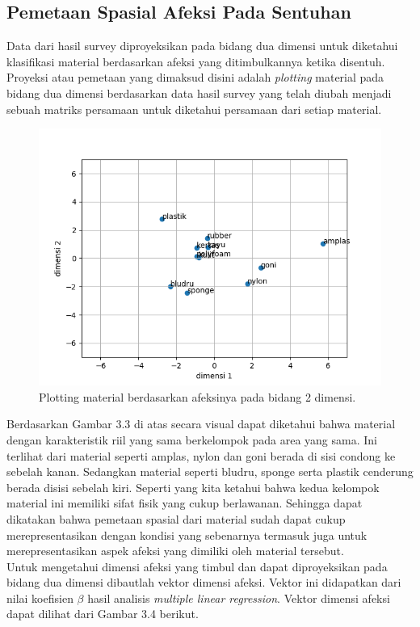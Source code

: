 \documentclass{Jurnal_kolo}
\begin{document}
\begin{multicols}{2}
	\subsection{Pemetaan Spasial Afeksi Pada Sentuhan}
	\indent Data dari hasil survey diproyeksikan pada bidang dua dimensi untuk diketahui klasifikasi material berdasarkan afeksi yang ditimbulkannya ketika disentuh. Proyeksi atau pemetaan yang dimaksud disini adalah \emph{plotting} material pada bidang dua dimensi berdasarkan data hasil survey yang telah diubah menjadi sebuah matriks persamaan untuk diketahui persamaan dari setiap material. 
	
		\begin{figure}[H]
		\centering
		\includegraphics[scale=0.5]{gambar/plotmaterial.png}
		\caption{Plotting material berdasarkan afeksinya pada bidang 2 dimensi.}
		\label{plot_1}
	\end{figure}   
	\indent Berdasarkan Gambar 3.3 di atas secara visual dapat diketahui bahwa material dengan karakteristik riil yang sama berkelompok pada area yang sama. Ini terlihat dari material seperti amplas, nylon dan goni berada di sisi condong ke sebelah kanan. Sedangkan material seperti bludru, sponge serta plastik cenderung berada disisi sebelah kiri. Seperti yang kita ketahui bahwa kedua kelompok material ini memiliki sifat fisik yang cukup berlawanan. Sehingga dapat dikatakan bahwa pemetaan spasial dari material sudah dapat cukup merepresentasikan dengan kondisi yang sebenarnya termasuk juga untuk merepresentasikan aspek afeksi yang dimiliki oleh material tersebut.\\
	\indent Untuk mengetahui dimensi afeksi yang timbul dan dapat diproyeksikan pada bidang dua dimensi dibautlah vektor dimensi afeksi. Vektor ini didapatkan dari nilai koefisien $\beta$ hasil analisis \emph{multiple linear regression}. Vektor dimensi afeksi dapat dilihat dari Gambar 3.4 berikut.\\

\end{multicols}
\end{document}
